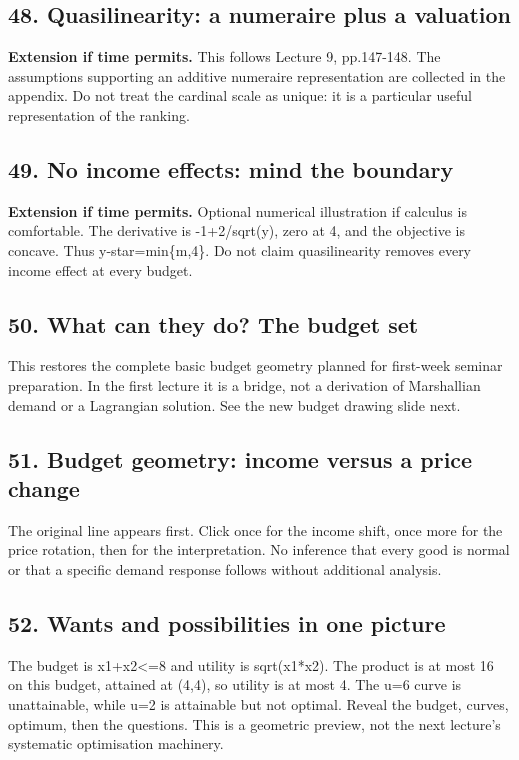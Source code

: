 \documentclass[11pt,a4paper]{article}
\begin{document}
\subsection*{48. Quasilinearity: a numeraire plus a valuation}
\textbf{Extension if time permits.} This follows Lecture 9, pp.147-148. The assumptions supporting an additive numeraire representation are collected in the appendix. Do not treat the cardinal scale as unique: it is a particular useful representation of the ranking.

\subsection*{49. No income effects: mind the boundary}
\textbf{Extension if time permits.} Optional numerical illustration if calculus is comfortable. The derivative is -1+2/sqrt(y), zero at 4, and the objective is concave. Thus y-star=min\{m,4\}. Do not claim quasilinearity removes every income effect at every budget.

\subsection*{50. What can they do? The budget set}
This restores the complete basic budget geometry planned for first-week seminar preparation. In the first lecture it is a bridge, not a derivation of Marshallian demand or a Lagrangian solution. See the new budget drawing slide next.

\subsection*{51. Budget geometry: income versus a price change}
The original line appears first. Click once for the income shift, once more for the price rotation, then for the interpretation. No inference that every good is normal or that a specific demand response follows without additional analysis.

\subsection*{52. Wants and possibilities in one picture}
The budget is x1+x2<=8 and utility is sqrt(x1*x2). The product is at most 16 on this budget, attained at (4,4), so utility is at most 4. The u=6 curve is unattainable, while u=2 is attainable but not optimal. Reveal the budget, curves, optimum, then the questions. This is a geometric preview, not the next lecture's systematic optimisation machinery.
\end{document}
